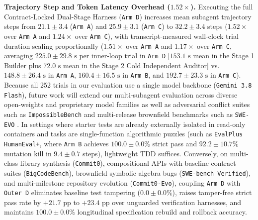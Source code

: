 \documentclass[11pt,a4paper,copyright]{google}
\begin{document}
\textbf{Trajectory Step and Token Latency Overhead ($1.52\times$).} Executing the full Contract-Locked Dual-Stage Harness (\texttt{Arm D}) increases mean subagent trajectory steps from $21.1 \pm 3.4$ (\texttt{Arm A}) and $25.9 \pm 3.1$ (\texttt{Arm C}) to $32.2 \pm 3.4$ steps ($1.52\times$ over \texttt{Arm A} and $1.24\times$ over \texttt{Arm C}), with transcript-measured wall-clock trial duration scaling proportionally ($1.51\times$ over \texttt{Arm A} and $1.17\times$ over \texttt{Arm C}, averaging $225.0 \pm 29.8\text{ s}$ per inner-loop trial in \texttt{Arm D} [$153.1\text{ s}$ mean in the Stage 1 Builder plus $72.0\text{ s}$ mean in the Stage 2 Cold Independent Auditor] vs.\ $148.8 \pm 26.4\text{ s}$ in \texttt{Arm A}, $160.4 \pm 16.5\text{ s}$ in \texttt{Arm B}, and $192.7 \pm 23.3\text{ s}$ in \texttt{Arm C}). Because all 252 trials in our evaluation use a single model backbone (\texttt{Gemini 3.8 Flash}), future work will extend our multi-subagent evaluation across diverse open-weights and proprietary model families as well as adversarial conflict suites such as \texttt{ImpossibleBench} \cite{zhong2025impossiblebench} and multi-release brownfield benchmarks such as \texttt{SWE-EVO} \cite{le2025sweevo}. In settings where starter tests are already externally isolated in read-only containers and tasks are single-function algorithmic puzzles (such as \texttt{EvalPlus HumanEval+}, where \texttt{Arm B} achieves $100.0 \pm 0.0\%$ strict pass and $92.2 \pm 10.7\%$ mutation kill in $9.4 \pm 0.7$ steps), lightweight TDD suffices. Conversely, on multi-class library synthesis (\texttt{Commit0}), compositional APIs with baseline contract suites (\texttt{BigCodeBench}), brownfield symbolic algebra bugs (\texttt{SWE-bench Verified}), and multi-milestone repository evolution (\texttt{Commit0-Evo}), coupling \texttt{Arm D} with \texttt{Outer D} eliminates baseline test tampering ($0.0 \pm 0.0\%$), raises tamper-free strict pass rate by $+21.7\text{ pp}$ to $+23.4\text{ pp}$ over unguarded verification harnesses, and maintains $100.0 \pm 0.0\%$ longitudinal specification rebuild and rollback accuracy.

{\let\oldthebibliography\thebibliography
\renewcommand{\thebibliography}[1]{\oldthebibliography{#1}\setlength{\itemsep}{2.3pt plus 0.5pt minus 0.5pt}\setlength{\parskip}{0pt}}

}
\end{document}
